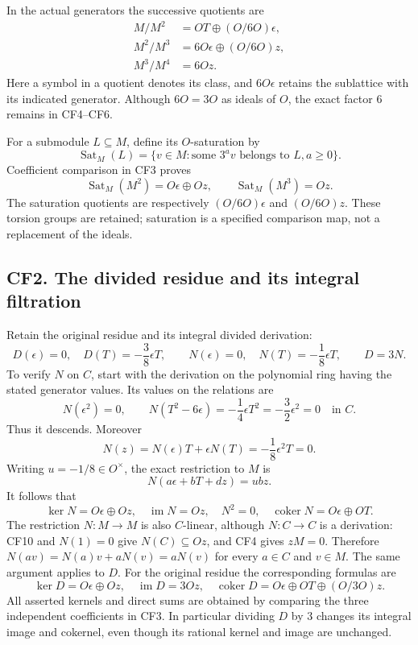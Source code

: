 \documentclass[
  10pt,
]{article}
\begin{document}
In the actual generators the successive quotients are \[
 \begin{split}
 M/M^2&=OT\oplus (O/6O)\epsilon,\\
 M^2/M^3&=6O\epsilon\oplus (O/6O)z,\\
 M^3/M^4&=6Oz.
 \end{split}
 \tag{CF6}
\] Here a symbol in a quotient denotes its class, and \(6O\epsilon\)
retains the sublattice with its indicated generator. Although \(6O=3O\)
as ideals of \(O\), the exact factor \(6\) remains in CF4--CF6.

For a submodule \(L\subseteq M\), define its \(O\)-saturation by \[
 \operatorname{Sat}_M(L)=\{v\in M:\text{some }3^a v\text{ belongs to }L, a\geq0\}.
\] Coefficient comparison in CF3 proves \[
 \operatorname{Sat}_M(M^2)=O\epsilon\oplus Oz,
 \qquad \operatorname{Sat}_M(M^3)=Oz.
 \tag{CF7}
\] The saturation quotients are respectively \((O/6O)\epsilon\) and
\((O/6O)z\). These torsion groups are retained; saturation is a
specified comparison map, not a replacement of the ideals.

\subsection{CF2. The divided residue and its integral
filtration}\label{cf2.-the-divided-residue-and-its-integral-filtration}

Retain the original residue and its integral divided derivation: \[
 D(\epsilon)=0,\quad D(T)=-\frac38\epsilon T,
 \qquad N(\epsilon)=0,\quad N(T)=-\frac18\epsilon T,
 \qquad D=3N.
 \tag{CF8}
\] To verify \(N\) on \(C\), start with the derivation on the polynomial
ring having the stated generator values. Its values on the relations are
\[
 N(\epsilon^2)=0,\qquad
 N(T^2-6\epsilon)=-\frac14\epsilon T^2
 =-\frac32\epsilon^2=0
 \quad\text{in }C.
 \tag{CF9}
\] Thus it descends. Moreover \[
 N(z)=N(\epsilon)T+\epsilon N(T)=-\frac18\epsilon^2T=0.
\] Writing \(u=-1/8\in O^\times\), the exact restriction to \(M\) is \[
 N(a\epsilon+bT+dz)=u b z.
 \tag{CF10}
\] It follows that \[
 \ker N=O\epsilon\oplus Oz,
 \quad\operatorname{im}N=Oz,
 \quad N^2=0,
 \quad\operatorname{coker}N=O\epsilon\oplus OT.
 \tag{CF11}
\] The restriction \(N:M\to M\) is also \(C\)-linear, although
\(N:C\to C\) is a derivation: CF10 and \(N(1)=0\) give
\(N(C)\subseteq Oz\), and CF4 gives \(zM=0\). Therefore
\(N(av)=N(a)v+aN(v)=aN(v)\) for every \(a\in C\) and \(v\in M\). The
same argument applies to \(D\). For the original residue the
corresponding formulas are \[
 \ker D=O\epsilon\oplus Oz,
 \quad\operatorname{im}D=3Oz,
 \quad\operatorname{coker}D
 =O\epsilon\oplus OT\oplus(O/3O)z.
 \tag{CF12}
\] All asserted kernels and direct sums are obtained by comparing the
three independent coefficients in CF3. In particular dividing \(D\) by
\(3\) changes its integral image and cokernel, even though its rational
kernel and image are unchanged.
\end{document}
